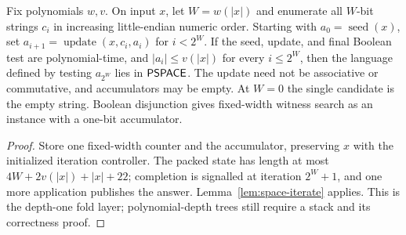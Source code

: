 \begin{lemma}
  \label{lem:space-bitstring-fold}
  \leanok
  Fix polynomials $w,v$. On input $x$, let $W=w(|x|)$ and enumerate all
  $W$-bit strings $c_i$ in increasing little-endian numeric order. Starting
  with $a_0=\operatorname{seed}(x)$, set
  $a_{i+1}=\operatorname{update}(x,c_i,a_i)$ for $i<2^W$.
  If the seed, update, and final Boolean test are polynomial-time, and
  $|a_i|\le v(|x|)$ for every $i\le 2^W$, then the language defined by testing
  $a_{2^W}$ lies in $\mathsf{PSPACE}$. The update need not be associative or
  commutative, and accumulators may be empty. At $W=0$ the single candidate
  is the empty string. Boolean disjunction gives fixed-width witness search
  as an instance with a one-bit accumulator.
\end{lemma}
\begin{proof}
  \leanok
  Store one fixed-width counter and the accumulator, preserving $x$ with
  the initialized iteration controller. The packed state has length at most
  $4W+2v(|x|)+|x|+22$; completion is signalled at iteration $2^W+1$, and one
  more application publishes the answer. Lemma~\ref{lem:space-iterate}
  applies. This is the depth-one fold layer; polynomial-depth trees still
  require a stack and its correctness proof.
\end{proof}


